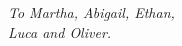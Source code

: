 \cleardoublepage
\thispagestyle{empty}
\begin{center}
\Large\itshape
To Martha, Abigail, Ethan, \\ Luca and Oliver.
\end{center}
